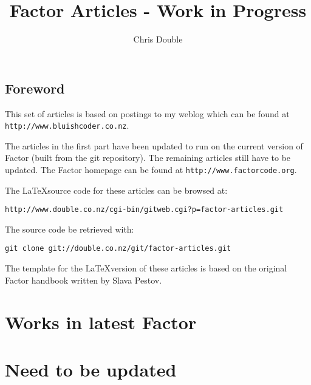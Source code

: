 \documentclass{book}
\begin{document}
\title{Factor Articles - Work in Progress}

\author{Chris Double}

\maketitle
\tableofcontents{}

\chapter*{Foreword}

This set of articles is based on postings to my weblog which can be found at \verb|http://www.bluishcoder.co.nz|.

The articles in the first part have been updated to run on the current version of Factor (built from the git repository). The remaining articles still have to be updated. The Factor homepage can be found at \verb|http://www.factorcode.org|.

The \LaTeX source code for these articles can be browsed at:
\begin{verbatim}
http://www.double.co.nz/cgi-bin/gitweb.cgi?p=factor-articles.git
\end{verbatim}

The source code be retrieved with:
\begin{verbatim}
git clone git://double.co.nz/git/factor-articles.git
\end{verbatim}

The template for the \LaTeX version of these articles is based on the original Factor handbook written by Slava Pestov.

\part{Works in latest Factor}







\part{Need to be updated}















\end{document}
